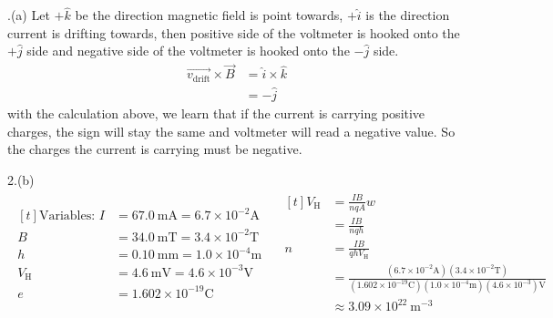 \documentclass[11pt]{article}
\begin{document}
.(a)
Let \(+\hat{k}\) be the direction magnetic field is point towards, \(+\hat{i}\) is the direction current is drifting towards, then positive side of the voltmeter is hooked onto the \(+\hat{j}\) side and negative side of the voltmeter is hooked onto the \(-\hat{j}\) side.
\begin{align*}
\overrightarrow{v_{\mathrm{drift}}} \times \overrightarrow{B} &= \hat{i} \times \hat{k} \\
  &= -\hat{j}
\end{align*}
with the calculation above, we learn that if the current is carrying positive charges, the sign will stay the same and voltmeter will read a negative value. So the charges the current is carrying must be negative.

2.(b)
\begin{align*}
\begin{aligned}[t]
\text{Variables: }
I &=67.0\ \mathrm{mA}=6.7 \times 10^{-2}\mathrm{A} \\
B & =34.0\ \mathrm{mT}=3.4 \times 10^{-2}\mathrm{T} \\
h & =0.10\ \mathrm{mm}=1.0 \times 10^{-4}\mathrm{m} \\
V_\mathrm{H} & =4.6\ \mathrm{mV}=4.6 \times 10^{-3}\mathrm{V} \\
e &=1.602 \times 10^{-19}\mathrm{C}
\end{aligned}
\quad
\begin{aligned}[t]
V_{\mathrm{H}} &= \frac{I B}{n q A} w \\
  &= \frac{I B}{nqh} \\
n &= \frac{I B}{qh V_\mathrm{H}} \\
  &=\frac{(6.7 \times 10^{-2} \mathrm{A}) (3.4 \times 10^{-2} \mathrm{T})}{(1.602 \times 10^{-19} \mathrm{C})(1.0 \times 10^{-4} \mathrm{m})(4.6 \times 10^{-3}) \mathrm{V}} \\
  &\approx 3.09\times10^{22}\ \mathrm{m^{-3}}
\end{aligned}
\end{align*}
\end{document}
